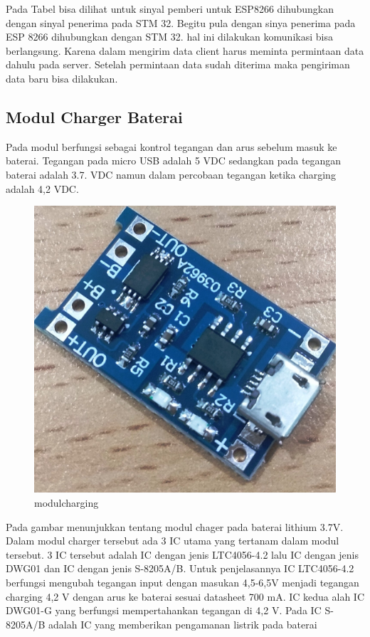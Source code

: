 \documentclass[11pt]{article}
\numberwithin{equation}{subsection}
\begin{document}
Pada Tabel bisa dilihat untuk sinyal pemberi untuk ESP8266 dihubungkan dengan sinyal penerima pada STM 32.
Begitu pula dengan sinya penerima pada ESP 8266 dihubungkan dengan STM 32. hal ini dilakukan komunikasi bisa berlangsung.
Karena dalam mengirim data client harus meminta permintaan data dahulu pada server.
Setelah permintaan data sudah diterima maka pengiriman data baru bisa dilakukan.
\subsection{Modul Charger Baterai}
Pada modul berfungsi sebagai kontrol tegangan dan arus sebelum masuk ke baterai.
Tegangan pada micro USB adalah 5 VDC sedangkan pada tegangan  baterai adalah 3.7.
VDC namun dalam percobaan tegangan ketika charging adalah 4,2 VDC.
\begin{figure}[!h]
	\centering
	\captionsetup{justification=centering}
	\includegraphics[width=0.7\linewidth]{dokumentasi/modulcharging.jpg}
	\caption[modulcharging]{\small{modulcharging}}
\end{figure}
Pada gambar menunjukkan tentang modul chager pada baterai lithium 3.7V.
Dalam modul charger tersebut ada 3 IC utama yang tertanam dalam modul tersebut.\cite{For2011}
3 IC tersebut adalah  IC dengan jenis LTC4056-4.2 lalu IC dengan jenis DWG01 dan IC dengan jenis S-8205A/B.
Untuk penjelasannya IC  LTC4056-4.2 berfungsi mengubah tegangan input dengan masukan 4,5-6,5V menjadi tegangan charging 4,2 V dengan arus ke baterai sesuai datasheet 700 mA\cite{LTC2018}.
IC kedua alah IC DWG01-G yang berfungsi mempertahankan tegangan di 4,2 V\cite{For2011}.
Pada IC S-8205A/B adalah IC yang memberikan pengamanan listrik pada baterai\cite{Ic2016}
\end{document}
